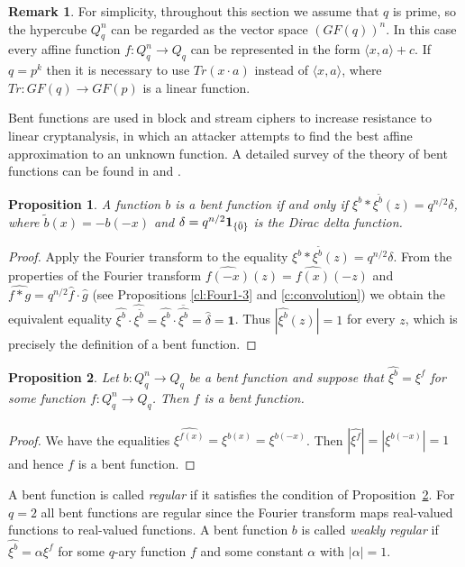 \documentclass[11pt]{article}
\newtheorem{claim}{Proposition}[section]
\theoremstyle{definition}
\newtheorem{remark}{Remark}[section]
\begin{document}
{{{\begin{remark} For simplicity, throughout  this section we assume that $q$ is prime, so
 the hypercube $Q^n_q$ can be regarded
as the vector space $(GF(q))^n$.   In this case every affine function $f:Q^n_q\rightarrow Q_q$
can be represented in  the form $\langle x,a\rangle+c$. If
$q=p^k$ then it is necessary to use $Tr(x\cdot a)$ instead of $\langle x,a\rangle$, where $Tr:GF(q)\rightarrow  GF(p)$ is a linear function.
\end{remark}

Bent functions are used in block and stream ciphers to increase resistance to linear cryptanalysis, in which an attacker attempts to find the best affine approximation to an unknown function. A detailed survey of the theory of bent functions can be found in
\cite{Mesnager} and \cite{Tok12}.



\begin{claim}\label{kriteriibent}
 A function $b$ is a bent function
if and only if $\xi^b
*\xi^{\widetilde{b}}(z)=q^{n/2}\delta$, where $\tilde{b}(x)=-b(-x)$ and $\delta=q^{n/2}{\bf 1}_{\{\bar 0\}}$ is the Dirac delta function.
\end{claim}
\begin{proof}
 Apply the Fourier transform to the equality $\xi^b
 *\xi^{\widetilde{b}}(z)=q^{n/2}\delta$.
From the properties of the Fourier transform
$\widehat{f(-x)}(z)={\widehat{f(x)}}(-z)$ and
$\widehat{f*g}=q^{n/2}\widehat{f}\cdot\widehat{g}$ (see Propositions \ref{cl:Four1-3} and \ref{c:convolution}) we obtain the equivalent equality
$\widehat{\xi^b}\cdot\widehat{\xi^{\widetilde{b}}}=\widehat{\xi^b}\cdot\overline{\widehat{\xi^b}}=\widehat{\delta}=\mathbf{1}$.
Thus
$|\widehat{\xi^b}(z)|=1$
for every $z$, which is precisely the definition of a bent function.
\end{proof}

\begin{claim}\label{c:bent}
Let $b:Q^n_q\rightarrow Q_q$ be a bent function and suppose that
$\widehat{\xi^b}=\xi^f$ for some function $f:Q^n_q\rightarrow
Q_q$. Then $f$ is a bent function.
\end{claim}
\begin{proof}
We have the equalities
$\widehat{\xi^{f(x)}}=\widehat{\widehat{\xi^{b(x)}}}=\xi^{b(-x)}$.
Then $|\widehat{\xi^f}|=|\xi^{b(-x)}|=1$ and hence $f$ is a bent function.
\end{proof}

A bent function is called {\sl regular} if it satisfies the condition
of Proposition~\ref{c:bent}. For $q=2$ all bent functions are regular since  the Fourier transform maps real-valued functions to real-valued functions.
A bent function $b$ is called {\sl weakly regular} if
$\widehat{\xi^b}=\alpha\xi^f$ for some $q$-ary function $f$ and some
constant $\alpha$ with  $|\alpha|=1$.

}}}
\end{document}
